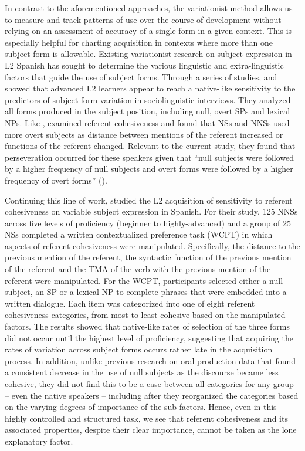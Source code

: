 \documentclass[output=paper]{langscibook}
\begin{document}
In contrast to the aforementioned approaches, the variationist method allows us to measure and track patterns of use over the course of development without relying on an assessment of accuracy of a single form in a given context. This is especially helpful for charting acquisition in contexts where more than one subject form is allowable. Existing variationist research on subject expression in L2 Spanish has sought to determine the various linguistic and extra-linguistic factors that guide the use of subject forms. Through a series of studies, \citet{GeeslinGudmestad2008, GeeslinGudmestad2010, GeeslinGudmestad2011} and \citet{GudmestadGeeslin2010} showed that advanced L2 learners appear to reach a native-like sensitivity to the predictors of subject form variation in sociolinguistic interviews. They analyzed all forms produced in the subject position, including null, overt SPs and lexical NPs. Like \citealt{BayleyPease-Alvarez1997}, \citet{GeeslinGudmestad2011} examined referent cohesiveness and found that NSs and NNSs used more overt subjects as distance between mentions of the referent increased or functions of the referent changed. Relevant to the current study, they found that perseveration occurred for these speakers given that “null subjects were followed by a higher frequency of null subjects and overt forms were followed by a higher frequency of overt forms” (\citealt[10]{GeeslinGudmestad2011}).



Continuing this line of work, \citet{LinfordGeeslinForthcoming} studied the L2 acquisition of sensitivity to referent cohesiveness on variable subject expression in Spanish. For their study, 125 NNSs across five levels of proficiency (beginner to highly-advanced) and a group of 25 NSs completed a written contextualized preference task (WCPT) in which aspects of referent cohesiveness were manipulated. Specifically, the distance to the previous mention of the referent, the syntactic function of the previous mention of the referent and the TMA of the verb with the previous mention of the referent were manipulated. For the WCPT, participants selected either a null subject, an SP or a lexical NP to complete phrases that were embedded into a written dialogue. Each item was categorized into one of eight referent cohesiveness categories, from most to least cohesive based on the manipulated factors. The results showed that native-like rates of selection of the three forms did not occur until the highest level of proficiency, suggesting that acquiring the rates of variation across subject forms occurs rather late in the acquisition process. In addition, unlike previous research on oral production data that found a consistent decrease in the use of null subjects as the discourse became less cohesive, they did not find this to be a case between all categories for any group – even the native speakers – including after they reorganized the categories based on the varying degrees of importance of the sub-factors. Hence, even in this highly controlled and structured task, we see that referent cohesiveness and its associated properties, despite their clear importance, cannot be taken as the lone explanatory factor. 
\end{document}
